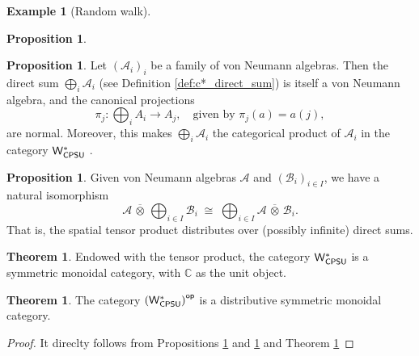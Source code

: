 \documentclass[10pt,a4paper]{amsart}
\theoremstyle{definition}
\theoremstyle{definition}
\newtheorem{example}[definition]{Example}
\theoremstyle{definition}
\theoremstyle{definition}
\newtheorem{proposition}[definition]{Proposition}
\theoremstyle{definition}
\theoremstyle{definition}
\newtheorem{theorem}[definition]{Theorem}
\begin{document}
\begin{example}[Random walk]
\begin{proposition}
  
\end{proposition}

\begin{proposition} \cite[Exercise 47 IV]{westerbaanCategoryNeumannAlgebras2019}  \label{prop:wcpsu_products}
  Let \( (\mathcal{A}_i)_i \) be a family of von Neumann algebras. Then the direct sum \( \bigoplus_i \mathcal{A}_i \) (see Definition \ref{def:c*_direct_sum}) is itself a von Neumann algebra, and the canonical projections
\[
\pi_j : \bigoplus_i A_i \to A_j, \quad \text{given by } \pi_j(a) = a(j),
\]
are normal.
Moreover, this makes \( \bigoplus_i \mathcal{A}_i \) the categorical product of \( \mathcal{A}_i \) in the category $\mathsf{W^*_{CPSU}}$ .
\end{proposition}

\begin{proposition}\cite[Proposition 117 III] {westerbaanCategoryNeumannAlgebras2019} \label{prop:w*_product_disct_tensor}
  Given von Neumann algebras \( \mathcal{A} \) and \( (\mathcal{B}_i)_{i \in I} \), we have a natural isomorphism
\[
\mathcal{A} \,\overline{\otimes}\, \bigoplus_{i \in I} \mathcal{B}_i \;\cong\; \bigoplus_{i \in I} \mathcal{A} \,\overline{\otimes}\, \mathcal{B}_i.
\]
That is, the spatial tensor product distributes over (possibly infinite) direct sums.
\end{proposition}

\begin{theorem} \cite[Theorem 119 V]{westerbaanCategoryNeumannAlgebras2019} \label{thm:wcpsu_monoidal}
Endowed with the tensor product, the category $\mathsf{W^*_{CPSU}}$  is a symmetric monoidal category, with \( \mathbb{C} \) as the unit object.
\end{theorem}

\begin{theorem}
The category $\left(\mathsf{W^*_{CPSU}}\right)^{\mathsf{op}}$ is a distributive symmetric monoidal category.
\end{theorem}

\begin{proof}
  It direclty follows from Propositions \ref{prop:wcpsu_products} and \ref{prop:w*_product_disct_tensor} and Theorem \ref{thm:wcpsu_monoidal}
\end{proof}





\end{example}
\end{document}
